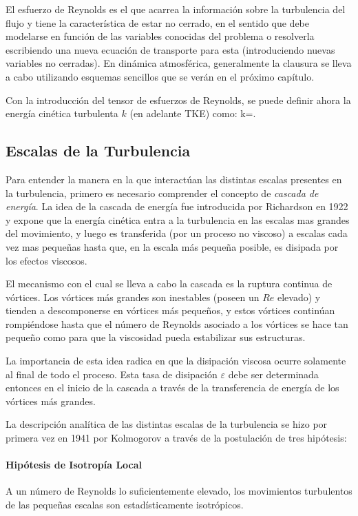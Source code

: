El esfuerzo de Reynolds es el que acarrea la información sobre la turbulencia del flujo y tiene la característica de estar no cerrado, en el sentido que debe modelarse en función de las variables conocidas del problema o resolverla escribiendo una nueva ecuación de transporte para esta (introduciendo nuevas variables no cerradas). En dinámica atmosférica, generalmente la clausura se lleva a cabo utilizando esquemas sencillos que se verán en el próximo capítulo.

Con la introducción del tensor de esfuerzos de Reynolds, se puede definir ahora la energía cinética turbulenta $k$ (en adelante TKE) como:
\be k=. \ee
\subsection{Escalas de la Turbulencia}
Para entender la manera en la que interactúan las distintas escalas presentes en la turbulencia, primero es necesario comprender el concepto de \emph{cascada de energía}. La idea de la cascada de energía fue introducida por Richardson en 1922 y expone que la energía cinética entra a la turbulencia en las escalas mas grandes del movimiento, y luego es transferida (por un proceso no viscoso) a escalas cada vez mas pequeñas hasta que, en la escala más pequeña posible, es disipada por los efectos viscosos.

El mecanismo con el cual se lleva a cabo la cascada es la ruptura continua de vórtices. Los vórtices más grandes son inestables (poseen un $Re$ elevado) y tienden a descomponerse en vórtices más pequeños, y estos vórtices continúan rompiéndose hasta que el número de Reynolds asociado a los vórtices se hace tan pequeño como para que la viscosidad pueda estabilizar sus estructuras.

La importancia de esta idea radica en que la disipación viscosa ocurre solamente al final de todo el proceso. Esta tasa de disipación $\varepsilon$ debe ser determinada entonces en el inicio de la cascada a través de la transferencia de energía de los vórtices más grandes.

La descripción analítica de las distintas escalas de la turbulencia se hizo por primera vez en 1941 por Kolmogorov a través de la postulación de tres hipótesis:
\paragraph{Hipótesis de Isotropía Local} A un número de Reynolds lo suficientemente elevado, los movimientos turbulentos de las pequeñas escalas son estadísticamente isotrópicos.
